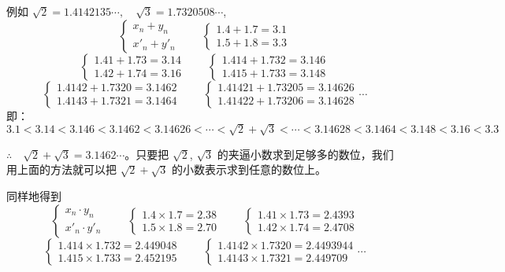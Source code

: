 例如 $\sqrt{2}=1.4142135\cdots,\quad \sqrt{3}=1.7320508\cdots$,
\[\begin{cases}
    x_n+y_n\\  x'_n+y'_n
\end{cases}\qquad \begin{cases}
    1.4+1.7=3.1 \\ 1.5+1.8=3.3
\end{cases}\]
\[\begin{cases}
    1.41+1.73=3.14\\1.42+1.74=3.16
\end{cases}\qquad \begin{cases}
    1.414+1.732=3.146\\1.415+1.733=3.148
\end{cases}\]
\[\begin{cases}
    1.4142+1.7320=3.1462\\
1.4143+1.7321=3.1464
\end{cases}\qquad \begin{cases}
    1.41421+1.73205=3.14626\\
1.41422+1.73206=3.14628
\end{cases}\cdots\]
即：
$3.1 <3.14<3.146<3.1462<3.14626<\cdots <\sqrt{2}+\sqrt{3}<\cdots <3.14628<3.1464<3.148<3.16<3.3$

$\therefore\quad \sqrt{2}+\sqrt{3}=3.1462\cdots$。只要把 $\sqrt{2}$, $\sqrt{3}$ 的夹逼小数求到足够多的数位，我们用上面的方法就可以把 $\sqrt{2}+\sqrt{3}$ 的小数表示求到任意的数位上。

同样地得到
\[\begin{cases}
    x_n\cdot y_n\\  x'_n\cdot y'_n
\end{cases}\qquad \begin{cases}
    1.4\times 1.7=2.38 \\ 1.5\times 1.8=2.70
\end{cases}\qquad \begin{cases}
    1.41\times 1.73=2.4393\\1.42\times 1.74=2.4708
\end{cases}\]
\[\begin{cases}
    1.414\times 1.732=2.449048\\1.415\times 1.733=2.452195
\end{cases}\qquad \begin{cases}
    1.4142\times 1.7320=2.4493944\\
1.4143\times 1.7321=2.449709
\end{cases}\cdots\]

